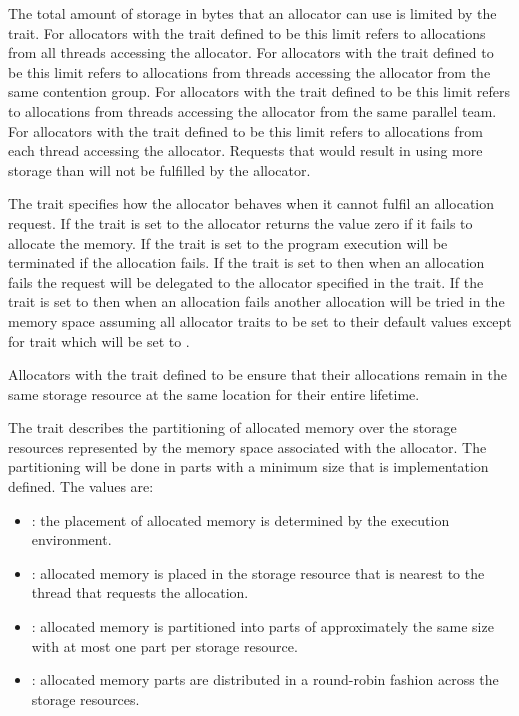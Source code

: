 The total amount of storage in bytes that an allocator can use is limited by 
the {} trait. For allocators with the  trait 
defined to be  this limit refers to allocations from all threads 
accessing the allocator. For allocators with the  trait defined 
to be  this limit refers to allocations from threads accessing 
the allocator from the same contention group. For allocators with the 
 trait defined to be  this limit refers to 
allocations from threads accessing the allocator from the same parallel 
team. For allocators with the  trait defined to be  
this limit refers to allocations from each thread accessing the allocator. 
Requests that would result in using more storage than {} 
will not be fulfilled by the allocator.

The  trait specifies how the allocator behaves when it 
cannot fulfil an allocation request. If the  trait is set 
to  the allocator returns the value zero if it fails to 
allocate the memory. If the  trait is set to  
the program execution will be terminated if the allocation fails. If the 
 trait is set to  then when an allocation 
fails the request will be delegated to the allocator specified in the 
 trait. If the  trait is set to 
 then when an allocation fails another allocation 
will be tried in the  memory space assuming 
all allocator traits to be set to their default values except for 
 trait which will be set to .

Allocators with the  trait defined to be  
ensure that their allocations remain in the same storage resource at 
the same location for their entire lifetime.

The {} trait describes the partitioning of allocated
memory over the storage resources represented by the memory space associated
with the allocator. The partitioning will be done in parts with a minimum size
that is implementation defined. The values are:

\begin{itemize}
\item {}: the placement of allocated memory is determined 
      by the execution environment.
\item {}: allocated memory is placed in the storage resource 
      that is nearest to the thread that requests the allocation.
\item {}: allocated memory is partitioned into parts of 
      approximately the same size with at most one part per storage resource.
\item {}: allocated memory parts are distributed in a 
      round-robin fashion across the storage resources.
\end{itemize}

